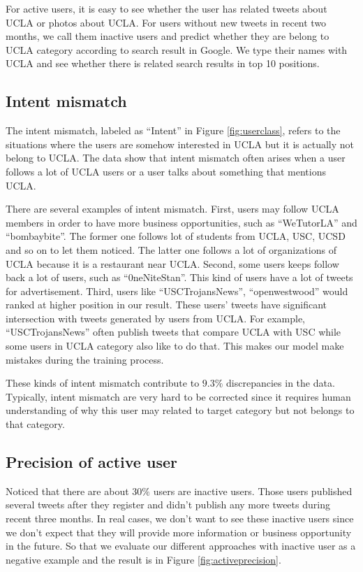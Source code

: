 \documentclass{article}
\begin{document}
For active users, it is easy to see whether the user has related tweets about UCLA or photos about UCLA. For users without new tweets in recent two months, we call them inactive users and predict whether they are belong to UCLA category according to search result in Google. We type their names with UCLA and see whether there is related search results in top 10 positions.

\subsection{Intent mismatch}
The intent mismatch, labeled as ``Intent'' in Figure \ref{fig:userclass}, refers to the situations where the users are somehow interested in UCLA but it is actually not belong to UCLA. The data show that intent mismatch often arises when a user follows a lot of UCLA users or a user talks about something that mentions UCLA.

There are several examples of intent mismatch. First, users may follow UCLA members in order to have more business opportunities, such as ``WeTutorLA'' and ``bombaybite''. The former one follows lot of students from UCLA, USC, UCSD and so on to let them noticed. The latter one follows a lot of organizations of UCLA because it is a restaurant near UCLA. Second, some users keeps follow back a lot of users, such as ``0neNiteStan''. This kind of users have a lot of tweets for advertisement. Third, users like ``USCTrojansNews'', ``openwestwood'' would ranked at higher position in our result. These users' tweets have significant intersection with tweets generated by users from UCLA. For example, ``USCTrojansNews'' often publish tweets that compare UCLA with USC while some users in UCLA category also like to do that. This makes our model make mistakes during the training process.

These kinds of intent mismatch contribute to $9.3\%$ discrepancies in the data. Typically, intent mismatch are very hard to be corrected since it requires human understanding of why this user may related to target category but not belongs to that category.

\subsection{Precision of active user}

Noticed that there are about $30\%$ users are inactive users. Those users published several tweets after they register and didn't publish any more tweets during recent three months. In real cases, we don't want to see these inactive users since we don't expect that they will provide more information or business opportunity in the future. So that we evaluate our different approaches with inactive user as a negative example and the result is in Figure \ref{fig:activeprecision}.
\end{document}
